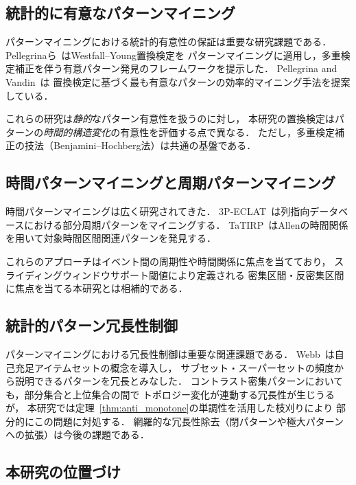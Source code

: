 \subsection{統計的に有意なパターンマイニング}

パターンマイニングにおける統計的有意性の保証は重要な研究課題である．
Pellegrinaら~\cite{pellegrina2019westfallyoung}はWestfall--Young置換検定を
パターンマイニングに適用し，多重検定補正を伴う有意パターン発見のフレームワークを提示した．
Pellegrina and Vandin~\cite{pellegrina2020significant}は
置換検定に基づく最も有意なパターンの効率的マイニング手法を提案している．

これらの研究は\emph{静的}なパターン有意性を扱うのに対し，
本研究の置換検定はパターンの\emph{時間的構造変化}の有意性を評価する点で異なる．
ただし，多重検定補正の技法（Benjamini--Hochberg法）は共通の基盤である．

\subsection{時間パターンマイニングと周期パターンマイニング}

時間パターンマイニングは広く研究されてきた．
3P-ECLAT~\cite{3peclat2024}は列指向データベースにおける部分周期パターンをマイニングする．
TaTIRP~\cite{tatirp2025}はAllenの時間関係を用いて対象時間区間関連パターンを発見する．

これらのアプローチはイベント間の周期性や時間関係に焦点を当てており，
スライディングウィンドウサポート閾値により定義される
密集区間・反密集区間に焦点を当てる本研究とは相補的である．

\subsection{統計的パターン冗長性制御}

パターンマイニングにおける冗長性制御は重要な関連課題である．
Webb~\cite{webb2007selfsufficient}は自己充足アイテムセットの概念を導入し，
サブセット・スーパーセットの頻度から説明できるパターンを冗長とみなした．
コントラスト密集パターンにおいても，部分集合と上位集合の間で
トポロジー変化が連動する冗長性が生じうるが，
本研究では定理~\ref{thm:anti_monotone}の単調性を活用した枝刈りにより
部分的にこの問題に対処する．
網羅的な冗長性除去（閉パターンや極大パターンへの拡張）は今後の課題である．

\subsection{本研究の位置づけ}

